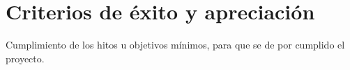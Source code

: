 \section{Criterios de éxito y apreciación}
Cumplimiento de los hitos u objetivos mínimos, para que se de por cumplido el proyecto.